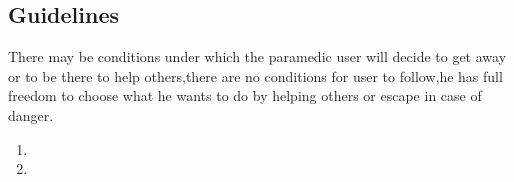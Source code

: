 \subsection{Guidelines}
There may be conditions under which the paramedic user will decide to get away or to be there to help others,there are no conditions for user to follow,he has full freedom to choose what he wants to do by helping others or escape in case of danger.

  


\begin{enumerate}
    \item
    \item

\end{enumerate}








